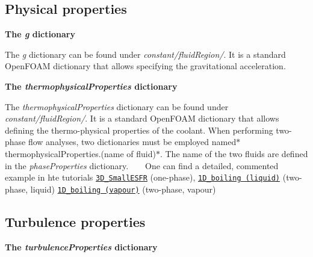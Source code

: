 \subsection*{Physical properties}

 {\bfseries The {\itshape g} dictionary}

The {\itshape g} dictionary can be found under {\itshape constant/fluid\+Region/}. It is a standard Open\+F\+O\+AM dictionary that allows specifying the gravitational acceleration.  ~\newline


 {\bfseries The {\itshape thermophysical\+Properties} dictionary}

The {\itshape thermophysical\+Properties} dictionary can be found under {\itshape constant/fluid\+Region/}. It is a standard Open\+F\+O\+AM dictionary that allows defining the thermo-\/physical properties of the coolant. When performing two-\/phase flow analyses, two dictionaries must be employed named$\ast$thermophysical\+Properties.(name of fluid)$\ast$. The name of the two fluids are defined in the {\itshape phase\+Properties} dictionary. ~\newline
~\newline
One can find a detailed, commented example in hte tutorials \href{https://gitlab.com/foam-for-nuclear/GeN-Foam/-/tree/master/Tutorials/3D_SmallESFR/rootCase/constant/fluidRegion/thermophysicalProperties}{\tt 3\+D\+\_\+\+Small\+E\+S\+FR} (one-\/phase), \href{https://gitlab.com/foam-for-nuclear/GeN-Foam/-/tree/master/Tutorials/1D_boiling/constant/fluidRegion/thermophysicalProperties.liquid}{\tt 1\+D\+\_\+boiling (liquid)} (two-\/phase, liquid) \href{https://gitlab.com/foam-for-nuclear/GeN-Foam/-/tree/master/Tutorials/1D_boiling/constant/fluidRegion/thermophysicalProperties.vapour}{\tt 1\+D\+\_\+boiling (vapour)} (two-\/phase, vapour)  ~\newline


\subsection*{Turbulence properties}

 {\bfseries The {\itshape turbulence\+Properties} dictionary}

